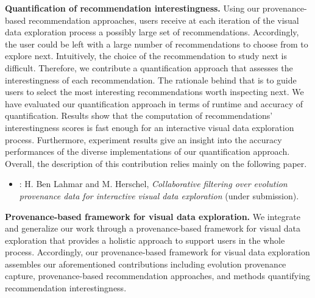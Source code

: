 \sloppy 
 \bigskip 
 \noindent \textbf{Quantification of recommendation interestingness.}
 Using our provenance-based recommendation approaches, users receive at each iteration of the visual data exploration process a possibly large set of recommendations.
Accordingly, the user could be left with a large number of recommendations to choose from to explore next. Intuitively, the choice of the recommendation to study next is difficult.
Therefore, we contribute a quantification approach that assesses the interestingness of each recommendation. The rationale behind that is to guide users to select the most interesting recommendations worth inspecting next.
We have evaluated our quantification approach in terms of runtime and accuracy of quantification.
Results show that the computation of recommendations' interestingness scores is fast enough for an interactive visual data exploration process. Furthermore, experiment results give an insight into the accuracy performances of the diverse implementations of our quantification approach.
Overall, the description of this contribution relies mainly on the following paper.
\begin{itemize}
\item \cite{Houssem:19:IS}: H. Ben Lahmar and M. Herschel, \emph{Collaborative filtering over evolution provenance data for interactive visual data exploration} (under submission).
\end{itemize}


 \bigskip
  \noindent \textbf{Provenance-based framework for visual data exploration.}
We integrate and generalize our work through a provenance-based framework for visual data exploration that provides a holistic approach to support users in the whole process. Accordingly, our provenance-based framework for visual data exploration assembles our aforementioned contributions including evolution provenance capture, provenance-based recommendation approaches, and methods quantifying recommendation interestingness. 


